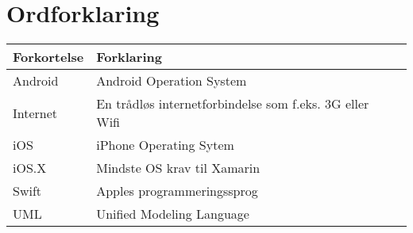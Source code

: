 \chapter*{Ordforklaring}

\begin{tabularx}{\textwidth}{l l X} \hline
	\textbf{Forkortelse}  & \textbf{Forklaring} \\ \hline
	Android& Android Operation System& \\
	Internet& En trådløs internetforbindelse som f.eks. 3G eller Wifi& \\
	iOS&  iPhone Operating Sytem& \\
	iOS.X& Mindste OS krav til Xamarin \\
	Swift& Apples programmeringssprog& \\
	UML& Unified Modeling Language& \\
	
\end{tabularx}